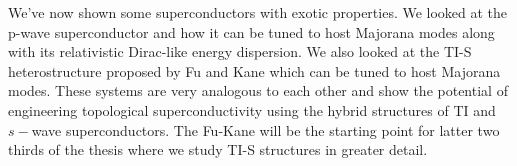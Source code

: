 We've now shown some superconductors with exotic properties. We looked at the p-wave superconductor and how it can be tuned to host Majorana modes along with its relativistic Dirac-like energy dispersion. We also looked at the TI-S heterostructure proposed by Fu and Kane which can be tuned to host Majorana modes. These systems are very analogous to each other and show the potential of engineering topological superconductivity using the hybrid structures of TI and $s-$wave superconductors. The Fu-Kane will be the starting point for latter two thirds of the thesis where we study TI-S structures in greater detail.
